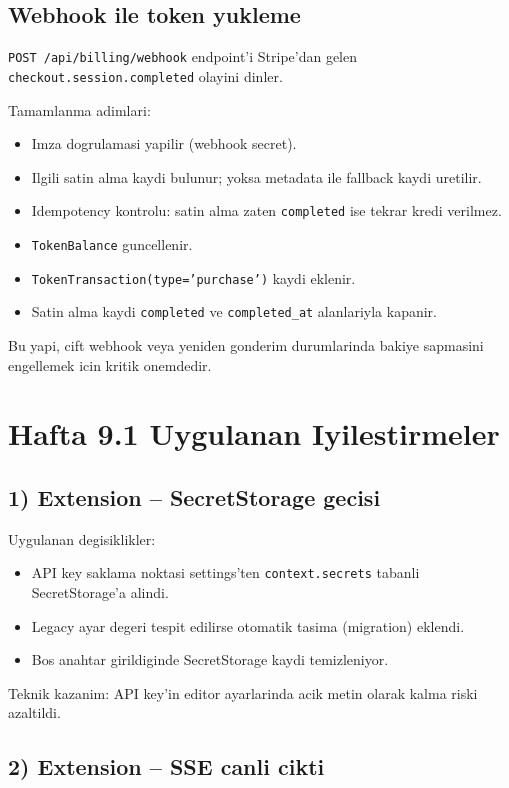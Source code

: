 \documentclass[11pt,a4paper]{article}
\begin{document}
\subsection{Webhook ile token yukleme}

\texttt{POST /api/billing/webhook} endpoint'i Stripe'dan gelen \texttt{checkout.session.completed} olayini dinler.

Tamamlanma adimlari:
\begin{itemize}[leftmargin=1.5em]
	\item Imza dogrulamasi yapilir (webhook secret).
	\item Ilgili satin alma kaydi bulunur; yoksa metadata ile fallback kaydi uretilir.
	\item Idempotency kontrolu: satin alma zaten \texttt{completed} ise tekrar kredi verilmez.
	\item \texttt{TokenBalance} guncellenir.
	\item \texttt{TokenTransaction(type='purchase')} kaydi eklenir.
	\item Satin alma kaydi \texttt{completed} ve \texttt{completed\_at} alanlariyla kapanir.
\end{itemize}

Bu yapi, cift webhook veya yeniden gonderim durumlarinda bakiye sapmasini engellemek icin kritik onemdedir.

\section{Hafta 9.1 Uygulanan Iyilestirmeler}

\subsection{1) Extension -- SecretStorage gecisi}

Uygulanan degisiklikler:
\begin{itemize}[leftmargin=1.5em]
	\item API key saklama noktasi settings'ten \texttt{context.secrets} tabanli SecretStorage'a alindi.
	\item Legacy ayar degeri tespit edilirse otomatik tasima (migration) eklendi.
	\item Bos anahtar girildiginde SecretStorage kaydi temizleniyor.
\end{itemize}

Teknik kazanim: API key'in editor ayarlarinda acik metin olarak kalma riski azaltildi.

\subsection{2) Extension -- SSE canli cikti}
\end{document}

